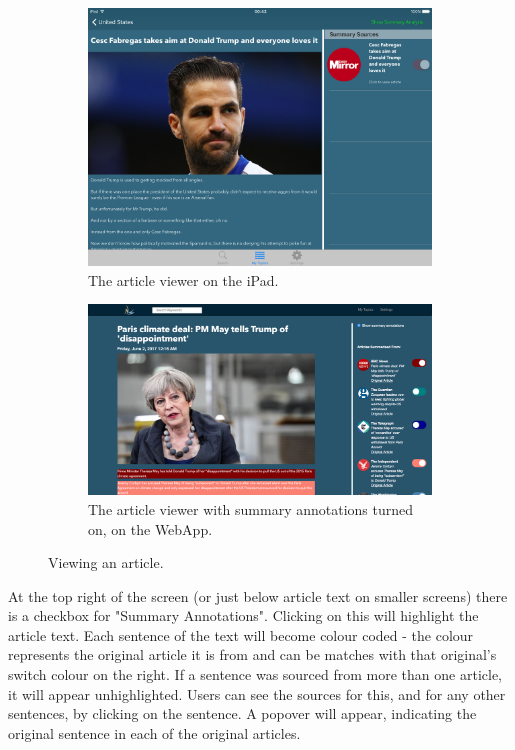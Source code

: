 \documentclass[12pt]{article}
\begin{document}
\begin{appendices}
\begin{figure}[ht!]
  \centering
  \begin{subfigure}[t]{0.6\textwidth}
        \includegraphics[width=\textwidth]{padarticle.PNG}
        \caption{The article viewer on the iPad.}
    \end{subfigure}
   \qquad
    \begin{subfigure}[t]{0.6\textwidth}
    \includegraphics[width=\textwidth]{desktoparticle.PNG}
   \caption{The article viewer with summary annotations turned on, on the WebApp.}
   \end{subfigure}
   \caption[Screenshots from the website and iOS Applications]{Viewing an article.}
   \label{crossviewing}
\end{figure}

At the top right of the screen (or just below article text on smaller screens) there is a checkbox for "Summary Annotations". Clicking on this will highlight the article text. Each sentence of the text will become colour coded - the colour represents the original article it is from and can be matches with that original's switch colour on the right. If a sentence was sourced from more than one article, it will appear unhighlighted. Users can see the sources for this, and for any other sentences, by clicking on the sentence. A popover will appear, indicating the original sentence in each of the original articles.


\end{appendices}
\end{document}
